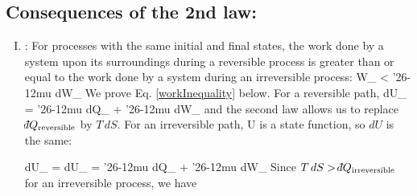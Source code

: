 \documentclass[12pt]{article}
\def\dbar{{\mathchar'26\mkern-12mu d}}
\begin{document}
\subsection{Consequences of the 2nd law:}
\begin{enumerate}[(I)]
\item {}: For processes with the same initial and final states, the work done by a system upon its surroundings during a reversible process is greater than or equal to the work done by a system during an irreversible process:
\beq \dbar W_ < \dbar W_ \label{workInequality}\ceq
We prove Eq. \ref{workInequality} below. For a reversible path, 
\beq dU_ = \dbar Q_ + \dbar W_ \ceq
and the second law allows us to replace $\dbar Q_\text{reversible}$ by $T\, dS$.  For an irreversible path, U is a state function, so $dU$ is the same:

\beq dU_ = dU_  = \dbar Q_ + \dbar W_ \ceq
Since $T \, dS > \dbar Q_\text{irreversible} $ for an irreversible process, we have


\end{enumerate}
\end{document}
